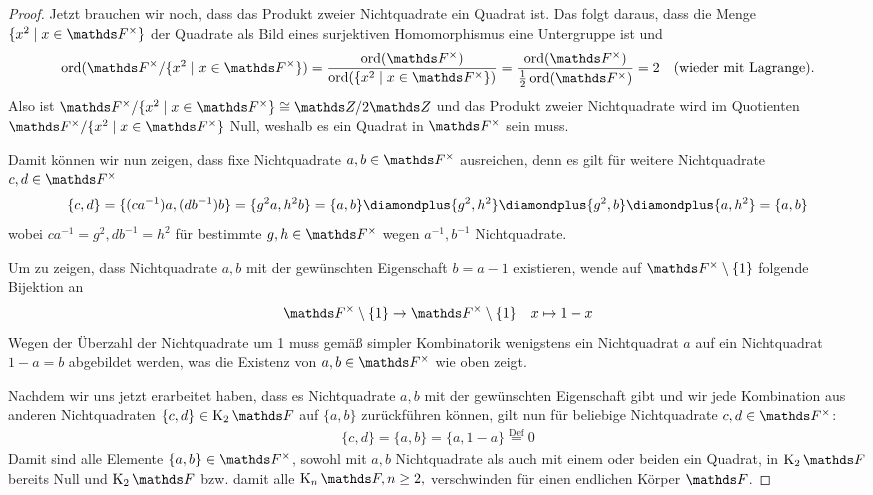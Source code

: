 \documentclass[ngerman,fontsize=11pt, paper=a4, parskip=half, titlepage=true, toc=bib]{scrartcl}
\begin{document}
\begin{Lem}
\begin{proof}
    Jetzt brauchen wir noch, dass das Produkt zweier Nichtquadrate ein
    Quadrat ist. Das folgt daraus, dass  die Menge 
    $\{x^2\mid x\in\Fx\}$ der Quadrate 
    als Bild eines surjektiven Homomorphismus eine Untergruppe ist und 
    \begin{gather*}
      \Ord(\Fx/\{x^2\mid x\in\Fx\})
      =\frac{\Ord(\Fx)}{\Ord(\{x^2\mid x\in\Fx\})}
      =\frac{\Ord(\Fx)}{\frac{1}{2}\Ord(\Fx)}=2
      \quad\text{(wieder mit Lagrange).}
    \end{gather*} 
    Also ist $\Fx/\{x^2\mid x\in\Fx\}\cong \Z/2\Z$ und das Produkt 
    zweier Nichtquadrate wird im Quotienten
    $\Fx/\{x^2\mid x\in\Fx\}$ Null, weshalb es ein Quadrat in $\Fx$
    sein muss.

    Damit können wir nun zeigen, dass fixe Nichtquadrate $a,b\in\Fx$
    ausreichen, denn es gilt für weitere Nichtquadrate $c,d\in\Fx$
    \begin{gather*}
      \{c,d\}=\{(ca^{-1})a,(db^{-1})b\}=\{g^2a,h^2b\}
      =\{a,b\}\p\{g^2,h^2\}\p\{g^2,b\}\p\{a,h^2\}
      =\{a,b\}
    \end{gather*}
    wobei $ca^{-1}=g^2,db^{-1}=h^2$ für bestimmte $g,h\in\Fx$
    wegen $a^{-1},b^{-1}$ Nichtquadrate.

    Um zu zeigen, dass Nichtquadrate $a,b$ mit der gewünschten
    Eigenschaft $b=a-1$ existieren, wende auf $\Fx\setminus\{1\}$ 
    folgende Bijektion an
    \begin{align*}
      \Fx\setminus\{1\}&\to \Fx\setminus\{1\}
      &x\mapsto 1-x
    \end{align*}
    Wegen der Überzahl der Nichtquadrate um 1 muss gemäß simpler
    Kombinatorik wenigstens ein Nichtquadrat $a$  auf ein Nichtquadrat
    $1-a=b$ abgebildet werden, was die Existenz
    von $a,b\in\Fx$ wie oben zeigt.

    Nachdem wir uns jetzt erarbeitet haben, dass es Nichtquadrate
    $a,b$ mit der gewünschten Eigenschaft gibt und wir jede
    Kombination aus anderen Nichtquadraten $\{c,d\}\in\K_2\F$ 
    auf $\{a,b\}$ zurückführen können,
    gilt nun für beliebige Nichtquadrate $c,d\in\Fx$:
    \begin{gather*}
      \{c,d\}=\{a,b\}=\{a,1-a\} \overset{\text{Def}}{=} 0
    \end{gather*}
    Damit sind alle Elemente $\{a,b\}\in\Fx$, sowohl mit $a,b$
    Nichtquadrate als auch mit einem oder beiden ein Quadrat, 
    in $\K_2\F$ bereits Null und $\K_2\F$
    bzw. damit alle $\K_n\F,n\geq 2,$ verschwinden für einen endlichen
    Körper $\F$.
  \end{proof}
\end{Lem}
\end{document}
